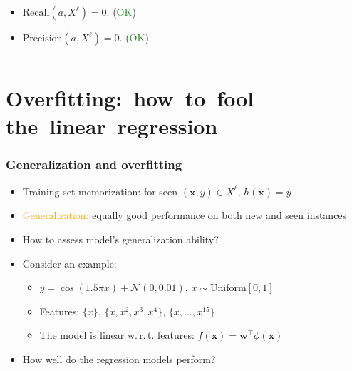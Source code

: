 \documentclass[usenames,dvipsnames,aspectratio=169]{beamer}
\begin{document}
\begin{frame}[t]
\begin{columns}
\begin{column}{0.5\textwidth}
\begin{itemize}
        \pause
        \begin{itemize}
            \item $\text{Recall}(a, X^\ell) = 0.$ (\textcolor{ForestGreen}{OK})

            \item $\text{Precision}(a, X^\ell) = 0.$ (\textcolor{ForestGreen}{OK})
        \end{itemize}

    \end{itemize}
\end{column}

\end{columns}

\end{frame}




\section{Overfitting:~how~to~fool the~linear~regression}




\begin{frame}
\frametitle{Generalization and overfitting}

\begin{itemize}
  \item Training set memorization:
  for seen $(\mathbf{x}, y) \in X^{\ell}$, $h(\mathbf{x}) = y$

  \pause
  \item \textcolor{orange}{Generalization:} 
   equally good performance
  on both new and seen instances

  \pause
  \item How to assess model's generalization ability?

  \pause
  \item Consider an example: 

  \begin{itemize}
    \item $y = \cos (1.5 \pi x) + \mathcal{N}(0, 0.01)$, 
    $x \sim \mathrm{Uniform}[0, 1]$

    \item Features: $\{x\}$, $\{x, x^2, x^3, x^4\}$,
    $\{x, \ldots, x^{15}\}$

    \item The model is linear w.\,r.\,t. features:
    $f(\mathbf{x}) = \mathbf{w}^{\intercal} \phi(\mathbf{x})$
  \end{itemize}

  \pause
  \item How well do the regression models perform?

\end{itemize}

\end{frame}
\end{document}

